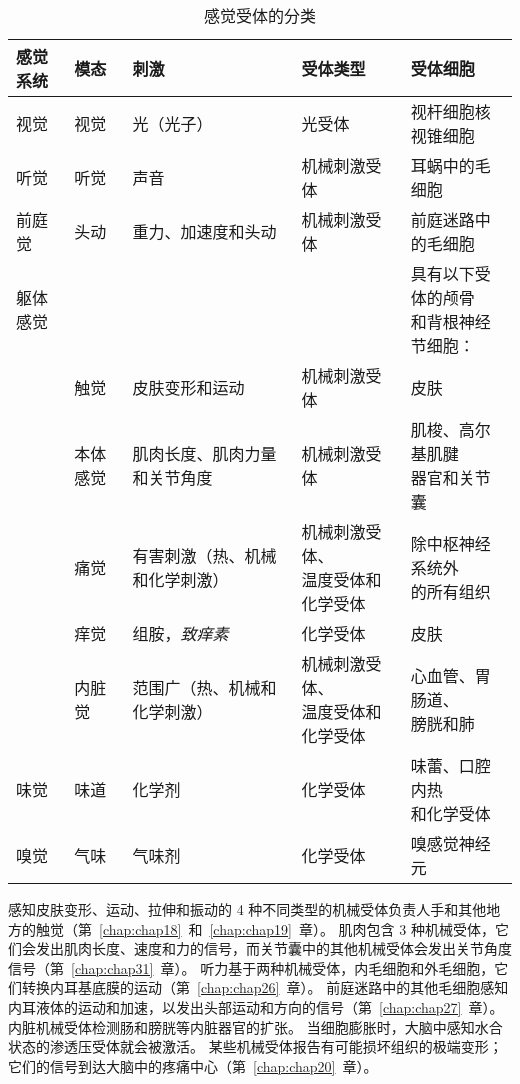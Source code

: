 \begin{table}[htbp]
	\centering
	\caption{感觉受体的分类}
	\begin{tabular}{lllll}
		\toprule
		感觉系统 & 模态 & 刺激 & 受体类型 & 受体细胞 \\
		\midrule
		视觉 & 视觉 & 光（光子）   & 光受体 & 视杆细胞核视锥细胞\\
		听觉 & 听觉 & 声音   & 机械刺激受体 & 耳蜗中的毛细胞 \\
		前庭觉 & 头动 & 重力、加速度和头动   & 机械刺激受体 & 前庭迷路中的毛细胞 \\
		躯体感觉 &  &   &  & \makecell[l]{具有以下受体的颅骨 \\ 和背根神经节细胞：} \\
		 & 触觉 & 皮肤变形和运动   & 机械刺激受体 & 皮肤 \\
		 & 本体感觉 & 肌肉长度、肌肉力量和关节角度   & 机械刺激受体 & \makecell[l]{肌梭、高尔基肌腱 \\ 器官和关节囊}  \\
		 & 痛觉 & 有害刺激（热、机械和化学刺激）  & \makecell[l]{机械刺激受体、 \\ 温度受体和化学受体}  & \makecell[l]{除中枢神经系统外 \\ 的所有组织}  \\
		 & 痒觉 & 组胺，\textit{致痒素}  & 化学受体 & 皮肤 \\
		 & 内脏觉 & 范围广（热、机械和化学刺激）  & \makecell[l]{机械刺激受体、 \\ 温度受体和化学受体} & \makecell[l]{心血管、胃肠道、 \\ 膀胱和肺}  \\
		味觉 & 味道 & 化学剂   & 化学受体 & \makecell[l]{味蕾、口腔内热 \\ 和化学受体}  \\
		嗅觉 & 气味 & 气味剂   & 化学受体 & 嗅感觉神经元 \\
		\bottomrule
	\end{tabular}%
	\label{tab:17_1}%
\end{table}%


感知皮肤变形、运动、拉伸和振动的 4 种不同类型的机械受体负责人手和其他地方的触觉（第~\ref{chap:chap18}~和~\ref{chap:chap19}~章）。
肌肉包含 3 种机械受体，它们会发出肌肉长度、速度和力的信号，而关节囊中的其他机械受体会发出关节角度信号（第~\ref{chap:chap31}~章）。
听力基于两种机械受体，内毛细胞和外毛细胞，它们转换内耳基底膜的运动（第~\ref{chap:chap26}~章）。 
前庭迷路中的其他毛细胞感知内耳液体的运动和加速，以发出头部运动和方向的信号（第~\ref{chap:chap27}~章）。 
内脏机械受体检测肠和膀胱等内脏器官的扩张。 
当细胞膨胀时，大脑中感知水合状态的渗透压受体就会被激活。 
某些机械受体报告有可能损坏组织的极端变形； 
它们的信号到达大脑中的疼痛中心（第~\ref{chap:chap20}~章）。


